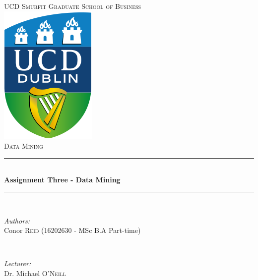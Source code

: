 \documentclass[paper=a4, fontsize=11pt]{scrartcl} %
\begin{document}
\begin{titlepage}

\newcommand{\HRule}{\rule{\linewidth}{0.5mm}} %

\center %


\textsc{\LARGE UCD Smurfit Graduate School of Business}\\[1.5cm] %
\includegraphics[scale = 0.6]{images/logo.png} \\ [1cm]
\textsc{\Large Data Mining}\\[0.5cm] %


\HRule \\[0.4cm]
{ \LARGE \bfseries Assignment Three - Data Mining}\\[0.4cm] %
\HRule \\[1.5cm]


\begin{minipage}{0.4\textwidth}
\begin{flushleft} \large
\emph{Authors:}\\
\small{
Conor \textsc{Reid} (16202630 - MSc B.A Part-time)
} %
\end{flushleft}
\end{minipage}
~
\begin{minipage}{0.4\textwidth}
\begin{flushright} \large
\emph{Lecturer:} \\
Dr. Michael \textsc{O'Neill} %
\end{flushright}
\end{minipage}\\[4cm]


\end{titlepage}
\end{document}
